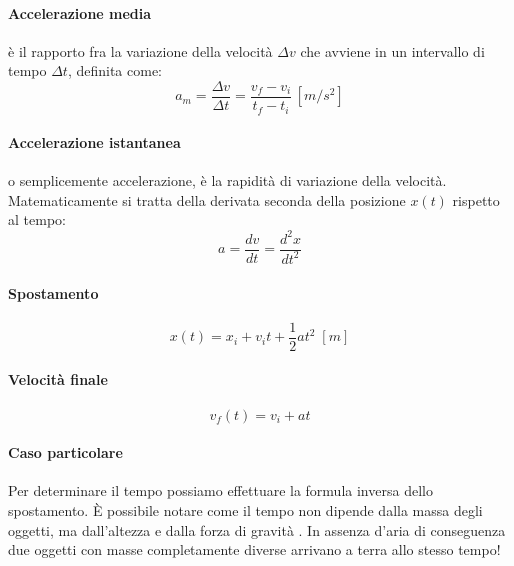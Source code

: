         \paragraph{Accelerazione media} è il rapporto fra la variazione della
        velocità $\Delta v$ che avviene in un intervallo di tempo $\Delta t$, 
        definita come:
        \begin{equation}
            a_m = \frac{\Delta v}{\Delta t} = \frac{v_f - v_i}{t_f - t_i} 
            \, [m/s^2]
        \end{equation}

        \paragraph{Accelerazione istantanea} o semplicemente accelerazione, è 
        la rapidità di variazione della velocità. Matematicamente si tratta 
        della derivata seconda della posizione $x(t)$ rispetto al tempo:
        \begin{equation}
            a = \frac{dv}{dt} = \frac{d^2x}{dt^2}
        \end{equation}

        \paragraph{Spostamento}
            \begin{equation}
                x(t) = x_i + v_it + \frac{1}{2}at^2 \; [m]
            \end{equation}

        \paragraph{Velocità finale}
            \begin{equation}
                v_f(t) = v_{i} + at
            \end{equation}
    
        \paragraph{Caso particolare}
            Per determinare il tempo possiamo effettuare la formula inversa 
            dello spostamento. È possibile notare come il tempo non dipende 
            dalla massa degli oggetti, ma dall'altezza e dalla forza di gravità
            . In assenza d'aria di conseguenza due oggetti con masse 
            completamente diverse arrivano a terra allo stesso tempo!

